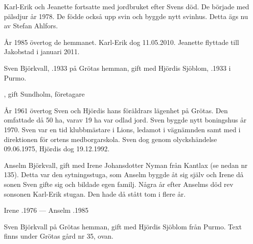 Karl-Erik och Jeanette fortsatte med  jordbruket efter Svens död. De började med pälsdjur år 1978. De födde också upp svin och byggde nytt svinhus. Detta ägs nu av Stefan Ahlfors.

År 1985 övertog de hemmanet. Karl-Erik dog 11.05.2010. Jeanette flyttade till Jakobstad i januari 2011.


Sven Björkvall, .1933 på Grötas hemman, gift med Hjördis Sjöblom, .1933 i Purmo.
\begin{jhchildren}
  \item {}
  \item {}, gift Sundholm, företagare
\end{jhchildren}

År 1961 övertog Sven och Hjördis hans föräldrars lägenhet på Grötas. Den omfattade då 50 ha, varav 19 ha var odlad jord. Sven byggde nytt boningshus år 1970. Sven var en tid klubbmästare i Lions, ledamot i vägnämnden samt med i direktionen för ortens medborgarskola. Sven dog genom olyckshändelse 09.06.1975, Hjördis dog 19.12.1992.





Anselm  Björkvall,  gift med Irene Johansdotter Nyman från Kantlax (se nedan nr 135).
Detta var den sytningsstuga, som Anselm byggde åt sig själv och Irene då sonen Sven gifte sig och bildade egen familj. Några år efter Anselms död rev sonsonen Karl-Erik stugan. Den hade då stått tom i flere år.

Irene .1976  ---  Anselm .1985





Sven Björkvall på Grötas hemman, gift med Hjördis Sjöblom från Purmo. Text finns under Grötas gård nr 35, ovan.\jhvspace{}


